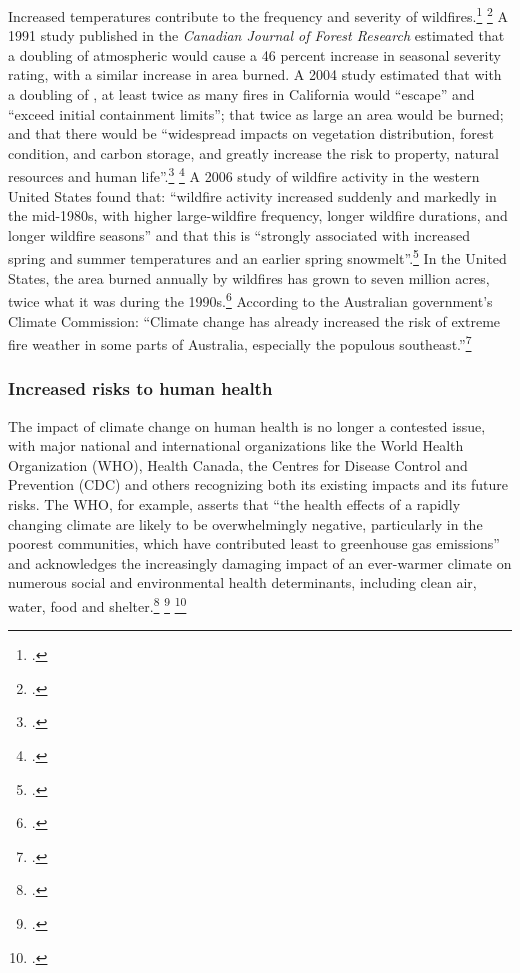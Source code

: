 Increased temperatures contribute to the frequency and severity of wildfires.\footcite[][p. 33, 48, 50, 51, 53, 65 ]{IPCCar4_syr} \footcite[See also: ][]{UCSWildfire}
A 1991 study published in the \emph{Canadian Journal of Forest Research} estimated that a doubling of atmospheric  would cause a 46 percent increase in seasonal severity rating, with a similar increase in area burned.
A 2004 study estimated that with a doubling of , at least twice as many fires in California would ``escape'' and ``exceed initial containment limits''; that twice as large an area would be burned; and that there would be ``widespread impacts on vegetation distribution, forest condition, and carbon storage, and greatly increase the risk to property, natural resources and human life''.\footcite[][p. 169]{FriedWildfire} \footcite[See also: ][]{WesterlingWildfire}
A 2006 study of wildfire activity in the western United States found that: ``wildfire activity increased suddenly and markedly in the mid-1980s, with higher large-wildfire frequency, longer wildfire durations, and longer wildfire seasons'' and that this is ``strongly associated with increased spring and summer temperatures and an earlier spring snowmelt''.\footcite[][p. 940--943]{Westerling2006}
In the United States, the area burned annually by wildfires has grown to seven million acres, twice what it was during the 1990s.\footcite[][]{NYTFireNewNormal}
According to the Australian government's Climate Commission: ``Climate change has already increased the risk of extreme fire weather in some parts of Australia, especially the populous southeast.''\footcite[][p. 4]{CriticalDecade2013}



	\subsubsection{Increased risks to human health}



The impact of climate change on human health is no longer a contested issue, with major national and international organizations like the World Health Organization (WHO), Health Canada, the Centres for Disease Control and Prevention (CDC) and others recognizing both its existing impacts and its future risks. 
The WHO, for example, asserts that ``the health effects of a rapidly changing climate are likely to be overwhelmingly negative, particularly in the poorest communities, which have contributed least to greenhouse gas emissions'' and acknowledges the increasingly damaging impact of an ever-warmer climate on numerous social and environmental health determinants, including clean air, water, food and shelter.\footcite[][]{WHOClimateHealth} \footcite[See also: ][]{LancetCCHealth} \footcite[See also: ][p. 811-7]{RacialEthnicHeat}



